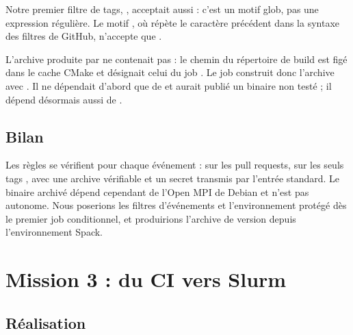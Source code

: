 \documentclass[11pt,a4paper]{article}
\newcommand{\fic}[1]{\code{#1}}
\begin{document}
Notre premier filtre de tags, , acceptait aussi  : c'est un motif
glob, pas une expression régulière. Le motif , où \code{+} répète le
caractère précédent dans la syntaxe des filtres de GitHub, n'accepte que .

L'archive produite par  ne contenait pas \fic{BUILDINFO.txt} : le chemin du
répertoire de build est figé dans le cache CMake et désignait celui du job . Le job
 construit donc l'archive avec . Il ne dépendait d'abord que de
 et aurait publié un binaire non testé ; il dépend désormais aussi de .

\subsection{Bilan}

Les règles se vérifient pour chaque événement :  sur les pull requests,
 sur les seuls tags , avec une archive vérifiable et un secret
transmis par l'entrée standard. Le binaire archivé dépend cependant de l'Open MPI de Debian et
n'est pas autonome. Nous poserions les filtres d'événements et l'environnement protégé dès le
premier job conditionnel, et produirions l'archive de version depuis l'environnement Spack.

\section{Mission 3 : du CI vers Slurm}

\subsection{Réalisation}
\end{document}

